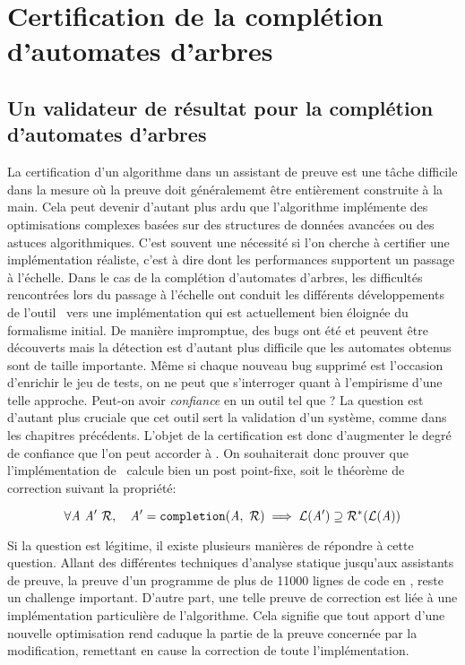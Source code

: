\chapter{Certification de la complétion d'automates d'arbres}
\label{chap:certif}


\switchlstcoq 

\section{Un validateur de résultat pour la complétion d'automates d'arbres}
\label{sec:objectives}


La certification d'un algorithme dans un assistant de preuve est une tâche difficile dans la mesure
où la preuve doit généralememt être entièrement construite à la main. Cela peut devenir d'autant plus ardu que l'algorithme implémente
des optimisations complexes basées sur des structures de données
avancées ou des astuces algorithmiques. C'est souvent une nécessité  si l'on cherche à certifier une implémentation réaliste,
c'est à dire dont les performances supportent un passage à l'échelle. 
Dans le cas de la complétion d'automates d'arbres, les difficultés rencontrées lors du passage à l'échelle ont
conduit les différents développements de l'outil \timbuk\ vers une implémentation qui est actuellement bien éloignée du formalisme initial.
De manière impromptue, des bugs ont été et peuvent être découverts mais la détection est d'autant plus difficile que les automates
obtenus sont de taille importante. Même si chaque nouveau bug supprimé est l'occasion d'enrichir le jeu de tests, on ne peut que
s'interroger quant à l'empirisme d'une telle approche.
Peut-on avoir {\em confiance} en un outil tel que \timbuk? La question est d'autant plus cruciale que cet outil sert
la validation d'un système, comme dans les chapitres précédents.
L'objet de la certification est donc d'augmenter le degré de confiance que l'on peut accorder à \timbuk.
On souhaiterait donc prouver que l'implémentation de \timbuk\ calcule bien un post point-fixe, soit 
le théorème de correction suivant la propriété:

\[\forall \mathit A\ \mathit A'\ \mathcal R,\quad \mathit A' = \mathtt{completion}(\mathit A,\ \mathcal R) \; \Longrightarrow \; \mathcal{L}(\mathit A') \supseteq \mathcal R^*(\mathcal{L}(\mathit A))\]

Si la question est légitime, il existe plusieurs manières de répondre à cette question. Allant des différentes
techniques d'analyse statique jusqu'aux assistants de preuve, la preuve d'un programme de plus de 11000 lignes
de code en \ocaml, reste un challenge important. D'autre part, une telle preuve de correction est liée 
à une implémentation particulière de l'algorithme. Cela signifie que tout apport d'une nouvelle optimisation
rend caduque la partie de la preuve concernée par la modification, remettant en cause la correction de toute
l'implémentation.

